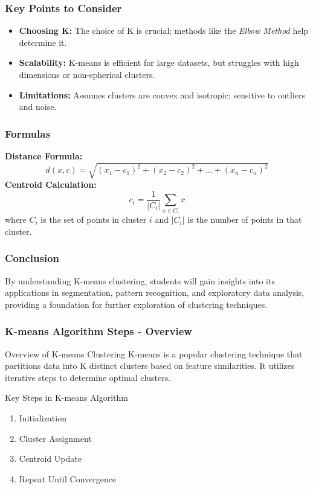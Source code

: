 \documentclass{beamer}
\begin{document}
\begin{frame}[fragile]
    \frametitle{Key Points to Consider}
    \begin{itemize}
        \item \textbf{Choosing K:} The choice of K is crucial; methods like the \textit{Elbow Method} help determine it.
        \item \textbf{Scalability:} K-means is efficient for large datasets, but struggles with high dimensions or non-spherical clusters.
        \item \textbf{Limitations:} Assumes clusters are convex and isotropic; sensitive to outliers and noise.
    \end{itemize}
\end{frame}

\begin{frame}[fragile]
    \frametitle{Formulas}
    \textbf{Distance Formula:}
    \begin{equation}
        d(x, c) = \sqrt{{(x_1 - c_1)^2 + (x_2 - c_2)^2 + ... + (x_n - c_n)^2}}
    \end{equation}
    \textbf{Centroid Calculation:}
    \begin{equation}
        c_i = \frac{1}{|C_i|} \sum_{x \in C_i} x
    \end{equation}
    where \(C_i\) is the set of points in cluster \(i\) and \(|C_i|\) is the number of points in that cluster.
\end{frame}

\begin{frame}[fragile]
    \frametitle{Conclusion}
    By understanding K-means clustering, students will gain insights into its applications in segmentation, pattern recognition, and exploratory data analysis, providing a foundation for further exploration of clustering techniques.
\end{frame}

\begin{frame}[fragile]
    \frametitle{K-means Algorithm Steps - Overview}
    \begin{block}{Overview of K-means Clustering}
        K-means is a popular clustering technique that partitions data into K distinct clusters based on feature similarities. It utilizes iterative steps to determine optimal clusters.
    \end{block}
    
    \begin{block}{Key Steps in K-means Algorithm}
        \begin{enumerate}
            \item Initialization
            \item Cluster Assignment
            \item Centroid Update
            \item Repeat Until Convergence
        \end{enumerate}
    \end{block}
\end{frame}
\end{document}
